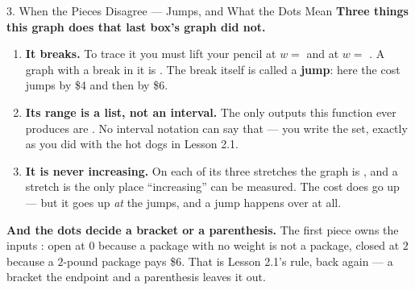 \documentclass[10pt]{article}
\begin{document}
\begin{notesbox}{3. When the Pieces Disagree --- Jumps, and What the Dots Mean}
\vspace{6pt}
\textbf{Three things this graph does that last box's graph did not.}
\begin{enumerate}[leftmargin=1.5em, itemsep=3pt, topsep=3pt]
  \item \textbf{It breaks.} To trace it you must lift your pencil at $w=$  and at $w=$
        . A graph with a break in it is . The break itself is called a
        \textbf{jump}: here the cost jumps by \$4 and then by \$6.
  \item \textbf{Its range is a list, not an interval.} The only outputs this function ever produces
        are . No interval notation can say that --- you write the set, exactly as you did
        with the hot dogs in Lesson 2.1.
  \item \textbf{It is never increasing.} On each of its three stretches the graph is
        , and a stretch is the only place ``increasing'' can be measured. The cost does
        go up --- but it goes up \emph{at} the jumps, and a jump happens over  at all.
\end{enumerate}

\vspace{4pt}
\textbf{And the dots decide a bracket or a parenthesis.} The first piece owns the inputs
: open at $0$ because a package with no weight is not a package, closed at $2$ because a
$2$-pound package pays \$6. That is Lesson 2.1's rule, back again --- a bracket 
the endpoint and a parenthesis leaves it out.
\end{notesbox}

\vspace{0.10in}
\end{document}
